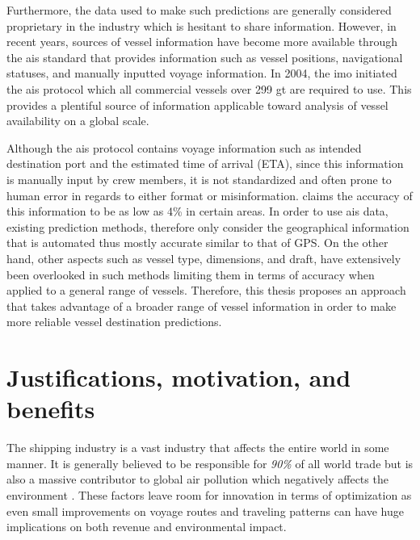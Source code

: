 

Furthermore, the data used to make such predictions are generally considered proprietary in the industry which is hesitant to share information. However, in recent years, sources of vessel information have become more available through the \acrshort{ais} standard that provides information such as vessel positions, navigational statuses, and manually inputted voyage information. In 2004, the \acrfull{imo} initiated the \acrshort{ais} protocol which all commercial vessels over 299 \acrfull{gt} are required to use. This provides a plentiful source of information applicable toward analysis of vessel availability on a global scale.

Although the \acrshort{ais} protocol contains voyage information such as intended destination port and the estimated time of arrival (ETA), since this information is manually input by crew members, it is not standardized and often prone to human error in regards to either format or misinformation. \cite{mestl2016} claims the accuracy of this information to be as low as 4\% in certain areas. In order to use \acrshort{ais} data, existing prediction methods, therefore only consider the geographical information that is automated thus mostly accurate similar to that of GPS\@. On the other hand, other aspects such as vessel type, dimensions, and draft, have extensively been overlooked in such methods limiting them in terms of accuracy when applied to a general range of vessels. Therefore, this thesis proposes an approach that takes advantage of a broader range of vessel information in order to make more reliable vessel destination predictions.

\section{Justifications, motivation, and benefits}
\label{section:justifications_motivations_benefits}

The shipping industry is a vast industry that affects the entire world in some manner. It is generally believed to be responsible for \textit{90\%} of all world trade \parencite{grote2016} but is also a massive contributor to global air pollution which negatively affects the environment \parencite{zheng2016:online}. These factors leave room for innovation in terms of optimization as even small improvements on voyage routes and traveling patterns can have huge implications on both revenue and environmental impact.

